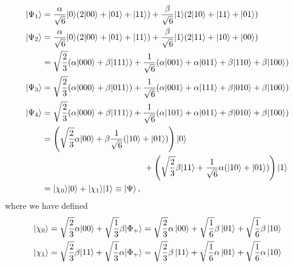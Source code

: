 \documentclass[11p]{article}
\begin{document}
\begin{align}
|\Psi_1\rangle &= \frac{\alpha}{\sqrt{6}}|0\rangle(2|00\rangle +|01\rangle + |11\rangle) + \frac{\beta}{\sqrt{6}}|1\rangle(2|10\rangle +|11\rangle + |01\rangle) \\
|\Psi_2\rangle &= \frac{\alpha}{\sqrt{6}}|0\rangle(2|00\rangle +|01\rangle + |11\rangle) + \frac{\beta}{\sqrt{6}}|1\rangle(2|11\rangle +|10\rangle + |00\rangle) \\
&= \sqrt{\frac{2}{3}}(\alpha|000\rangle+\beta|111\rangle) + \frac{1}{\sqrt{6}}(\alpha|001\rangle +\alpha|011\rangle + \beta|110\rangle + \beta |100\rangle) \\
|\Psi_3\rangle &= \sqrt{\frac{2}{3}}(\alpha|000\rangle+\beta|011\rangle) + \frac{1}{\sqrt{6}}(\alpha|001\rangle +\alpha|111\rangle + \beta|010\rangle + \beta |100\rangle) \\
|\Psi_4\rangle &= \sqrt{\frac{2}{3}}(\alpha|000\rangle+\beta|111\rangle) + \frac{1}{\sqrt{6}}(\alpha|101\rangle +\alpha|011\rangle + \beta|010\rangle + \beta |100\rangle) \\
&=\left( \sqrt{\frac{2}{3}}\alpha|00\rangle +\beta \frac{1}{\sqrt{6}}(|10\rangle+|01\rangle)\right)|0\rangle\notag \\
&\qquad \qquad \qquad \qquad \qquad \qquad + \left( \sqrt{\frac{2}{3}}\beta|11\rangle + \frac{1}{\sqrt{6}}\alpha(|10\rangle + |01\rangle )\right)|1\rangle \\
&= |\chi_0\rangle|0\rangle+|\chi_1\rangle|1\rangle\equiv \ket{\Psi},
\end{align}
where we have defined
\begin{align}
|\chi_0\rangle &= \sqrt{\frac{2}{3}}\alpha|00\rangle + \sqrt{\frac{1}{3}}\beta|\Phi_+\rangle=\sqrt{\frac{2}{3}}\alpha\ket{00}+\sqrt{\frac{1}{6}}\beta\ket{01}+\sqrt{\frac{1}{6}}\beta\ket{10}\\
|\chi_1\rangle &= \sqrt{\frac{2}{3}}\beta|11\rangle +\sqrt{\frac{1}{3}}\alpha |\Phi_+\rangle=\sqrt{\frac{2}{3}}\beta\ket{11}+\sqrt{\frac{1}{6}}\alpha\ket{01}+\sqrt{\frac{1}{6}}\alpha\ket{10}
\end{align}
\end{document}
